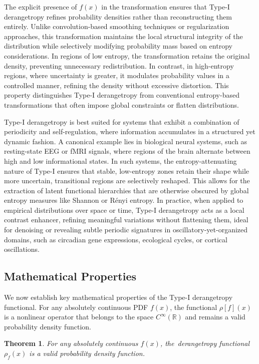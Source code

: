 \documentclass[sn-mathphys-num]{sn-jnl}%
\theoremstyle{thmstyleone}%
\newtheorem{theorem}{Theorem}%
\theoremstyle{thmstyletwo}%
\theoremstyle{thmstylethree}%
\begin{document}
The explicit presence of $f(x)$ in the transformation ensures that Type-I derangetropy refines probability densities rather than reconstructing them entirely. Unlike convolution-based smoothing techniques or regularization approaches, this transformation maintains the local structural integrity of the distribution while selectively modifying probability mass based on entropy considerations. In regions of low entropy, the transformation retains the original density, preventing unnecessary redistribution. In contrast, in high-entropy regions, where uncertainty is greater, it modulates probability values in a controlled manner, refining the density without excessive distortion. This property distinguishes Type-I derangetropy from conventional entropy-based transformations that often impose global constraints or flatten distributions.

Type-I derangetropy is best suited for systems that exhibit a combination of periodicity and self-regulation, where information accumulates in a structured yet dynamic fashion. A canonical example lies in biological neural systems, such as resting-state EEG or fMRI signals, where regions of the brain alternate between high and low informational states. In such systems, the entropy-attenuating nature of Type-I ensures that stable, low-entropy zones retain their shape while more uncertain, transitional regions are selectively reshaped. This allows for the extraction of latent functional hierarchies that are otherwise obscured by global entropy measures like Shannon or R\'enyi entropy. In practice, when applied to empirical distributions over space or time, Type-I derangetropy acts as a local contrast enhancer, refining meaningful variations without flattening them, ideal for denoising or revealing subtle periodic signatures in oscillatory-yet-organized domains, such as circadian gene expressions, ecological cycles, or cortical oscillations.

\subsection{Mathematical Properties}
We now establish key mathematical properties of the Type-I derangetropy functional. For any absolutely continuous PDF $f(x)$, the functional $\rho[f](x)$ is a nonlinear operator that belongs to the space $C^{\infty}(\mathbb{R})$ and remains a valid probability density function.
\begin{theorem}
	For any absolutely continuous $f(x)$, the~derangetropy functional $\rho_f(x)$ is a valid probability density function.
\end{theorem}
\end{document}
